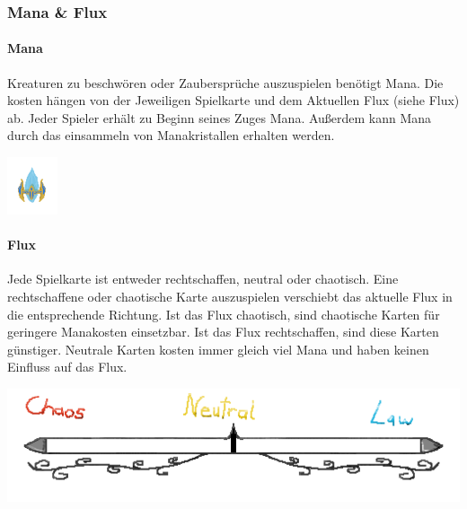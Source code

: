\documentclass[a4paper,12pt]{scrartcl}
\begin{document}
	\subsubsection{Mana \& Flux}
	\paragraph{Mana}
	Kreaturen zu beschwören oder Zaubersprüche auszuspielen benötigt Mana. Die kosten hängen von der Jeweiligen Spielkarte und dem Aktuellen Flux (siehe \glqq Flux\grqq\hspace{0.05em}) ab.
	Jeder Spieler erhält zu Beginn seines Zuges Mana. Außerdem kann Mana durch das einsammeln von Manakristallen erhalten werden.\\
	\begin{center}\includegraphics{Prog2_EA_V2/Art/Mana_Crystal.png}\end{center}
	\paragraph{Flux}
	Jede Spielkarte ist entweder rechtschaffen, neutral oder chaotisch.
	Eine rechtschaffene oder chaotische Karte auszuspielen verschiebt das aktuelle Flux in die entsprechende Richtung.
	Ist das Flux chaotisch, sind chaotische Karten für geringere Manakosten einsetzbar. Ist das Flux rechtschaffen, sind diese Karten günstiger.
	Neutrale Karten kosten immer gleich viel Mana und haben keinen Einfluss auf das Flux.\\
	\begin{center}\includegraphics{Prog2_EA_V2/Art/Flux.png}\end{center}
	
	\newpage
\end{document}
